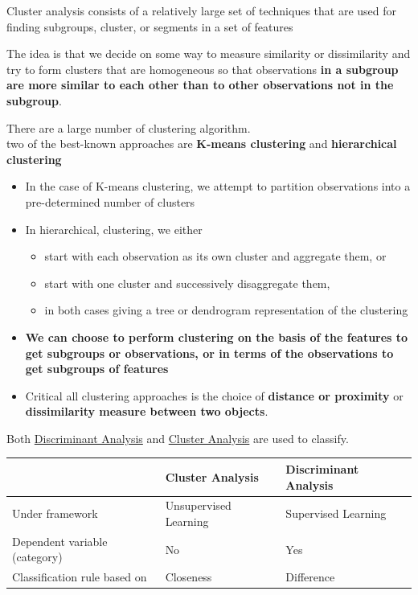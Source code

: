 \documentclass[
]{book}
\begin{document}
Cluster analysis consists of a relatively large set of techniques that are used for finding subgroups, cluster, or segments in a set of features

The idea is that we decide on some way to measure similarity or dissimilarity and try to form clusters that are homogeneous so that observations \textbf{in a subgroup are more similar to each other than to other observations not in the subgroup}.

There are a large number of clustering algorithm.\\
two of the best-known approaches are \textbf{K-means clustering} and \textbf{hierarchical clustering}

\begin{itemize}
\item
  In the case of K-means clustering, we attempt to partition observations into a pre-determined number of clusters
\item
  In hierarchical, clustering, we either

  \begin{itemize}
  \item
    start with each observation as its own cluster and aggregate them, or
  \item
    start with one cluster and successively disaggregate them,
  \item
    in both cases giving a tree or dendrogram representation of the clustering
  \end{itemize}
\item
  \textbf{We can choose to perform clustering on the basis of the features to get subgroups or observations, or in terms of the observations to get subgroups of features}
\item
  Critical all clustering approaches is the choice of \textbf{distance or proximity} or \textbf{dissimilarity measure between two objects}.
\end{itemize}

Both \protect\hyperlink{discriminant-analysis}{Discriminant Analysis} and \protect\hyperlink{cluster-analysis}{Cluster Analysis} are used to classify.

\begin{longtable}[]{@{}lll@{}}
\toprule
& Cluster Analysis & Discriminant Analysis\tabularnewline
\midrule
\endhead
Under framework & Unsupervised Learning & Supervised Learning\tabularnewline
Dependent variable (category) & No & Yes\tabularnewline
Classification rule based on & Closeness & Difference\tabularnewline
\bottomrule
\end{longtable}
\end{document}
